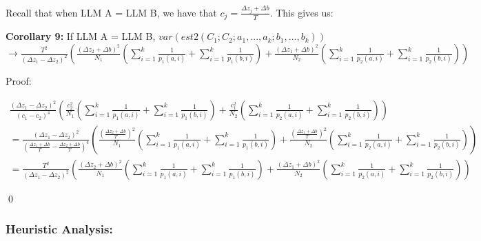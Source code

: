 \documentclass{article}
\begin{document}
Recall that when LLM A = LLM B, we have that $\displaystyle c_{j} =\frac{\Delta z_{j} +\Delta b}{T}$. This gives us:



\textbf{Corollary 9:} If LLM A = LLM B, $\displaystyle
var\left( est2\left( C_{1} ;C_{2} ;a_{1} ,...,a_{k} ;b_{1} ,...,b_{k}\right)\right)$\\
$\rightarrow \frac{T^{2}}{\left( \Delta z_{1} -\Delta z_{2}\right)^{2}}\left(\frac{\left( \Delta z_{2} +\Delta b\right)^{2}}{N_{1}}\left(\sum _{i=1}^{k}\frac{1}{p_{1}\left( a,i\right)} +\sum _{i=1}^{k}\frac{1}{p_{1}\left( b,i\right)}\right) +\frac{\left( \Delta z_{1} +\Delta b\right)^{2}}{N_{2}}\left(\sum _{i=1}^{k}\frac{1}{p_{2}\left( a,i\right)} +\sum _{i=1}^{k}\frac{1}{p_{2}\left( b,i\right)}\right)\right)$



Proof:

$\displaystyle  \begin{array}{l}
\frac{\left( \Delta z_{1} -\Delta z_{2}\right)^{2}}{\left( c_{1} -c_{2}\right)^{4}}\left(\frac{c_{2}^{2}}{N_{1}}\left(\sum _{i=1}^{k}\frac{1}{p_{1}\left( a,i\right)} +\sum _{i=1}^{k}\frac{1}{p_{1}\left( b,i\right)}\right) +\frac{c_{1}^{2}}{N_{2}}\left(\sum _{i=1}^{k}\frac{1}{p_{2}\left( a,i\right)} +\sum _{i=1}^{k}\frac{1}{p_{2}\left( b,i\right)}\right)\right)\\
=\frac{\left( \Delta z_{1} -\Delta z_{2}\right)^{2}}{\left(\frac{\Delta z_{1} +\Delta b}{T} -\frac{\Delta z_{2} +\Delta b}{T}\right)^{4}}\left(\frac{\left(\frac{\Delta z_{2} +\Delta b}{T}\right)^{2}}{N_{1}}\left(\sum _{i=1}^{k}\frac{1}{p_{1}\left( a,i\right)} +\sum _{i=1}^{k}\frac{1}{p_{1}\left( b,i\right)}\right) +\frac{\left(\frac{\Delta z_{1} +\Delta b}{T}\right)^{2}}{N_{2}}\left(\sum _{i=1}^{k}\frac{1}{p_{2}\left( a,i\right)} +\sum _{i=1}^{k}\frac{1}{p_{2}\left( b,i\right)}\right)\right)\\
=\frac{T^{2}}{\left( \Delta z_{1} -\Delta z_{2}\right)^{2}}\left(\frac{\left( \Delta z_{2} +\Delta b\right)^{2}}{N_{1}}\left(\sum _{i=1}^{k}\frac{1}{p_{1}\left( a,i\right)} +\sum _{i=1}^{k}\frac{1}{p_{1}\left( b,i\right)}\right) +\frac{\left( \Delta z_{1} +\Delta b\right)^{2}}{N_{2}}\left(\sum _{i=1}^{k}\frac{1}{p_{2}\left( a,i\right)} +\sum _{i=1}^{k}\frac{1}{p_{2}\left( b,i\right)}\right)\right)
\end{array}$

\qed 



\subsubsection*{Heuristic Analysis:}
\end{document}
